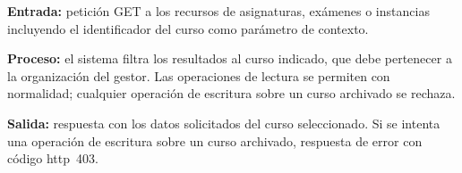 \begin{functional}
    \textbf{Entrada:} petición GET a los recursos de asignaturas, exámenes o instancias
    incluyendo el identificador del curso como parámetro de contexto.

    \textbf{Proceso:} el sistema filtra los resultados al curso indicado, que debe
    pertenecer a la organización del gestor. Las operaciones de lectura se permiten con
    normalidad; cualquier operación de escritura sobre un curso archivado se rechaza.

    \textbf{Salida:} respuesta con los datos solicitados del curso seleccionado. Si se
    intenta una operación de escritura sobre un curso archivado, respuesta de error con
    código \acs{http}~403.

\end{functional}
